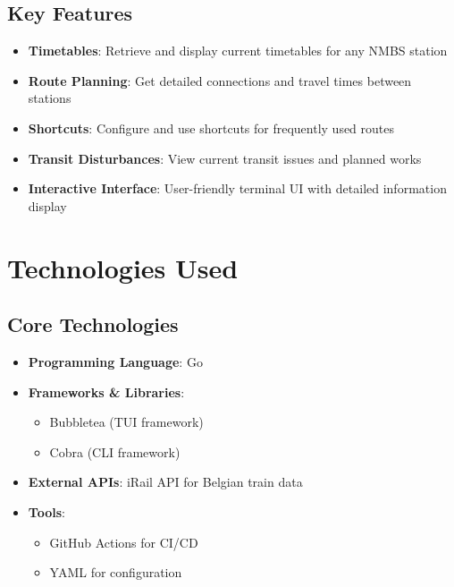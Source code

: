\documentclass[10pt,a4paper]{article}
\begin{document}
\subsection{Key Features}
\begin{itemize}
	\item \textbf{Timetables}: Retrieve and display current timetables for any NMBS station
	\item \textbf{Route Planning}: Get detailed connections and travel times between stations
	\item \textbf{Shortcuts}: Configure and use shortcuts for frequently used routes
	\item \textbf{Transit Disturbances}: View current transit issues and planned works
	\item \textbf{Interactive Interface}: User-friendly terminal UI with detailed information display
\end{itemize}

\section{Technologies Used}
\subsection{Core Technologies}
\begin{itemize}
	\item \textbf{Programming Language}: Go
	\item \textbf{Frameworks \& Libraries}:
	      \begin{itemize}
		      \item Bubbletea (TUI framework)
		      \item Cobra (CLI framework)
	      \end{itemize}
	\item \textbf{External APIs}: iRail API for Belgian train data
	\item \textbf{Tools}:
	      \begin{itemize}
		      \item GitHub Actions for CI/CD
		      \item YAML for configuration
	      \end{itemize}
\end{itemize}
\end{document}
